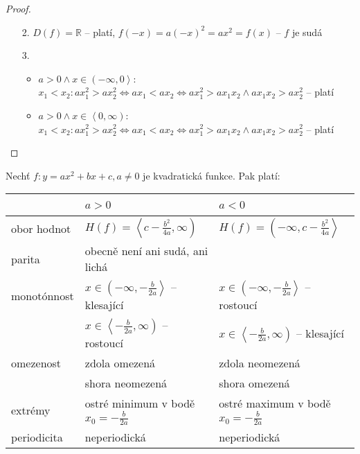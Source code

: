 \begin{proof} \,
    \begin{enumerate}[2.]
        \item[2.] $D(f) = \mathbb R$ -- platí, $f(-x)=a(-x)^2=ax^2=f(x)$ -- $f$ je sudá
        \item[3.] \begin{itemize}
        \item $a>0 \land x\in \left (-\infty,0\right >$: \\
        $x_1<x_2:ax_1^2 > ax_2^2 \iff ax_1 <ax_2 \iff ax_1^2>ax_1x_2 \land ax_1x_2 > ax_2^2$ -- platí
            \item $a>0 \land x\in \left <0,\infty\right )$: \\
            $x_1<x_2:ax_1^2 > ax_2^2 \iff ax_1 <ax_2 \iff ax_1^2>ax_1x_2 \land ax_1x_2 > ax_2^2$ -- platí\qedhere
        \end{itemize}
    \end{enumerate}
\end{proof}

\begin{veta}
  Nechť $f:y = ax^2+bx+c, a \neq 0$ je kvadratická funkce. Pak platí:\\
  \begin{center}
    \begin{tabularx}{\textwidth}{ l | l  l }
        \, & $a>0$ & $a<0$ \\
        \hline
        obor hodnot & $H(f) = \left <c-\frac{b^2}{4a}, \infty \right)$ & $H(f) = \left (-\infty, c-\frac{b^2}{4a}\right >$ \\
        parita & obecně není ani sudá, ani lichá & \, \\
        monotónnost & $x \in \left (-\infty, -\frac{b}{2a} \right >$ -- klesající & $x \in \left (-\infty, -\frac{b}{2a} \right >$ -- rostoucí \\
        \, & $x \in \left < -\frac{b}{2a}, \infty \right )$ -- rostoucí & $x \in \left < -\frac{b}{2a}, \infty \right )$ -- klesající \\
        omezenost & zdola omezená & zdola neomezená \\
        \, & shora neomezená & shora omezená \\
        extrémy &  ostré minimum v bodě $x_0=-\frac{b}{2a}$ & ostré maximum v bodě $x_0=-\frac{b}{2a}$ \\
        periodicita & neperiodická & neperiodická
    \end{tabularx}
  \end{center}
\end{veta}

